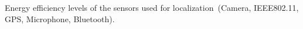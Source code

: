 Energy efficiency levels of the sensors used for localization\ (Camera, IEEE802.11, GPS, Microphone, Bluetooth). 
